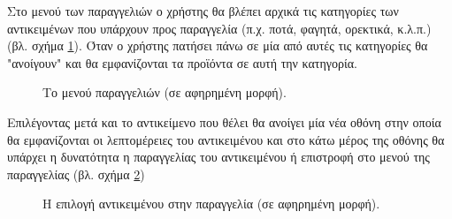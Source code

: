 \documentclass{assignment}
\begin{document}
Στο μενού των παραγγελιών ο χρήστης θα βλέπει αρχικά τις κατηγορίες των αντικειμένων που υπάρχουν προς παραγγελία (π.χ. ποτά, φαγητά, ορεκτικά, κ.λ.π.) (βλ. σχήμα \ref{fig:menu:paraggelia}). Όταν ο χρήστης πατήσει πάνω σε μία από αυτές τις κατηγορίες θα "ανοίγουν" και θα εμφανίζονται τα προϊόντα σε αυτή την κατηγορία. 

\begin{figure}
\begin{center}
\caption{Το μενού παραγγελιών (σε αφηρημένη μορφή).}
\label{fig:menu:paraggelia}
\end{center}
\end{figure}

Επιλέγοντας μετά και το αντικείμενο που θέλει θα ανοίγει μία νέα οθόνη στην οποία θα εμφανίζονται οι λεπτομέρειες του αντικειμένου και στο κάτω μέρος της οθόνης θα υπάρχει η δυνατότητα η παραγγελίας του αντικειμένου ή επιστροφή στο μενού της παραγγελίας (βλ. σχήμα \ref{fig:menu:paraggelia_item})

\begin{figure}
\begin{center}
\caption{Η επιλογή αντικειμένου στην παραγγελία (σε αφηρημένη μορφή).}
\label{fig:menu:paraggelia_item}
\end{center}
\end{figure}
\end{document}
